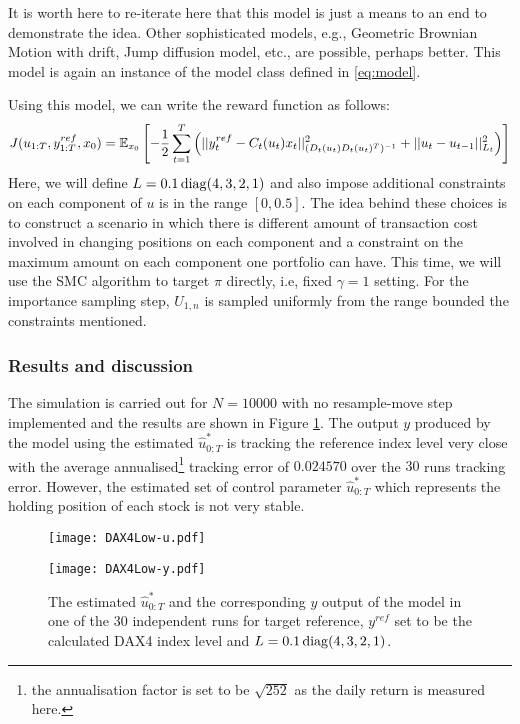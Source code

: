 It is worth here to re-iterate here that this model is just a means to an end to demonstrate the idea. Other sophisticated models, e.g., Geometric Brownian Motion with drift, Jump diffusion model, etc., are possible, perhaps better. This model is again an instance of the model class defined in \eqref{eq:model}.

Using this model, we can write the reward function as follows:
\begin{equation}
  J(u_{1:T},y^{ref}_{1:T}, x_0) = \operatorname{\mathbb{E}}_{x_0}\left[ -\dfrac{1}{2}\displaystyle\sum^T_{t=1}\left(\vert\vert y^{ref}_t - C_t(u_t)x_t \vert\vert^2_{(D_t(u_t)D_t(u_t)^T)^{-1}}  + \vert\vert u_t - u_{t-1} \vert\vert^2_{L_t}\right) \right]
\end{equation}
Here, we will define $L = 0.1\operatorname{diag}(4,3,2,1)$ and also impose additional constraints on each component of $u$ is in the range $[0,0.5]$. The idea behind these choices is to construct a scenario in which there is different amount of transaction cost involved in changing positions on each component and a constraint on the maximum amount on each component one portfolio can have. This time, we will use the SMC algorithm to target $\pi$ directly, i.e, fixed $\gamma=1$ setting. For the importance sampling step, $U_{1,n}$ is sampled uniformly from the range bounded the constraints mentioned. 

\subsubsection{Results and discussion}
The simulation is carried out for $N=10000$ with no resample-move step implemented and the results are shown in Figure \ref{fig:dax4}. The output $y$ produced by the model using the estimated $\hat{u}^*_{0:T}$ is tracking the reference index level very close with the average annualised\footnote{the annualisation factor is set to be $\sqrt{252}$ as the daily return is measured here.} tracking error of $0.024570$ over the $30$ runs tracking error. However, the estimated set of control parameter $\hat{u}^*_{0:T}$ which represents the holding position of each stock is not very stable.

\begin{figure}[tbp]
\centering
    \begin{minipage}{0.5\textwidth}
        \centering
        \texttt{[image: DAX4Low-u.pdf]}
    \end{minipage}%
    \begin{minipage}{0.5\textwidth}
        \centering
        \texttt{[image: DAX4Low-y.pdf]}
    \end{minipage}
\caption{The estimated $\hat{u}^*_{0:T}$ and the corresponding $y$ output of the model in one of the 30 independent runs for target reference, $y^{ref}$ set to be the calculated DAX4 index level and $L = 0.1\operatorname{diag}(4,3,2,1)$.}
\label{fig:dax4}
\end{figure}

